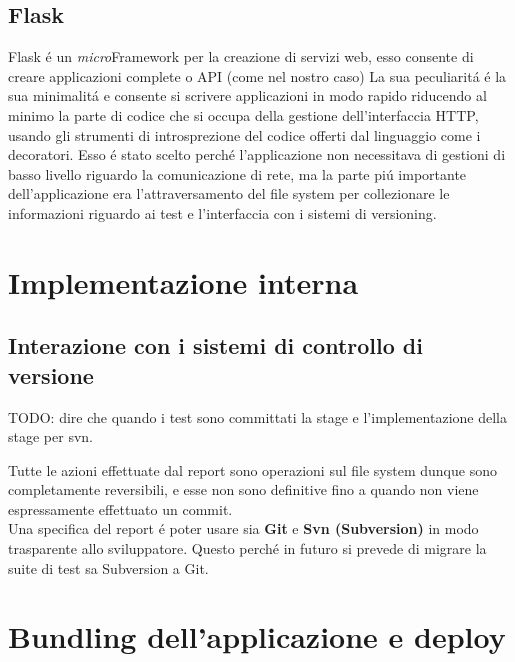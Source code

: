         \subsection{Flask}  
            Flask \'e un \textit{micro}Framework per la creazione di servizi web, esso consente di creare applicazioni complete o API (come nel nostro caso)
            La sua peculiarit\'a \'e la sua minimalit\'a e consente si scrivere applicazioni in modo rapido riducendo al minimo la parte di codice che si occupa della gestione dell'interfaccia HTTP, usando gli strumenti di introsprezione del codice offerti dal linguaggio come i decoratori.
            Esso \'e stato scelto perch\'e l'applicazione non necessitava di gestioni di basso livello riguardo la comunicazione di rete, ma la parte pi\'u importante dell'applicazione era l'attraversamento del file system per collezionare le informazioni riguardo ai test e l'interfaccia con i sistemi di versioning.

    \section{Implementazione interna}
        \subsection{Interazione con i sistemi di controllo di versione}
                
            TODO: dire che quando i test sono committati la stage e l'implementazione della stage per svn.

            Tutte le azioni effettuate dal report sono operazioni sul file system dunque sono completamente reversibili, e esse non sono definitive fino a quando non viene espressamente effettuato un commit.\\
            Una specifica del report \'e poter usare sia \textbf{Git} e \textbf{Svn (Subversion)} in modo trasparente allo sviluppatore.
            Questo perch\'e in futuro si prevede di migrare la suite di test sa Subversion a Git.
    
    \section{Bundling dell'applicazione e deploy}
              